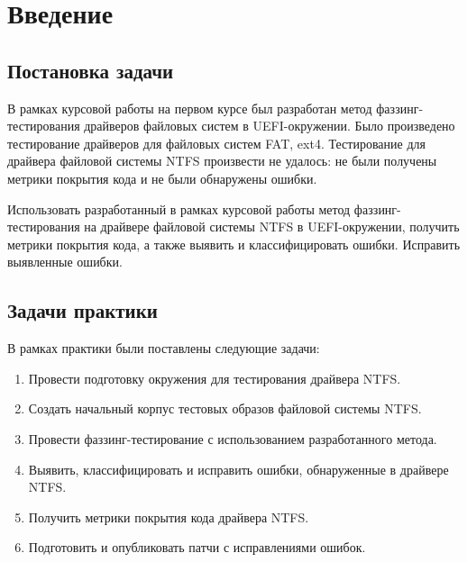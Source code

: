 \section{Введение}
\subsection{Постановка задачи}
В рамках курсовой работы на первом курсе был разработан метод фаззинг-тестирования драйверов файловых систем в UEFI-окружении. Было произведено тестирование драйверов для файловых систем FAT, ext4. Тестирование для драйвера файловой системы NTFS произвести не удалось: не были получены метрики покрытия кода и не были обнаружены ошибки.

Использовать разработанный в рамках курсовой работы метод фаззинг-тестирования на драйвере файловой системы NTFS в UEFI-окружении, получить метрики покрытия кода, а также выявить и классифицировать ошибки. Исправить выявленные ошибки.

\subsection{Задачи практики}
В рамках практики были поставлены следующие задачи:
\begin{enumerate}
	\item Провести подготовку окружения для тестирования драйвера NTFS.
	\item Создать начальный корпус тестовых образов файловой системы NTFS.
	\item Провести фаззинг-тестирование с использованием разработанного метода.
	\item Выявить, классифицировать и исправить ошибки, обнаруженные в драйвере NTFS.
	\item Получить метрики покрытия кода драйвера NTFS.
	\item Подготовить и опубликовать патчи с исправлениями ошибок.
\end{enumerate}
